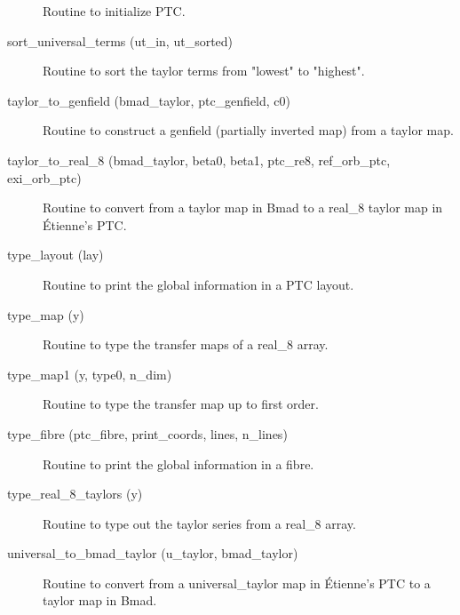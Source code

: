 \begin{description}
\label{r:set.ptc}
\item[\protect\parbox{6in}{
    set_ptc (e_tot, particle, taylor_order, integ_order, n_step, no_cavity, \\
    \hspace*{1in} force_init) }] \Newline
Routine to initialize PTC. 

\label{r:sort.universal.terms}
\item[sort_universal_terms (ut_in, ut_sorted)] \Newline
Routine to sort the taylor terms from "lowest" to "highest". 

\label{r:taylor.to.genfield}
\item[taylor_to_genfield (bmad_taylor, ptc_genfield, c0)] \Newline
Routine to construct a genfield (partially inverted map) from a taylor map. 

\label{r:taylor.to.real.8}
\item[taylor_to_real_8 (bmad_taylor, beta0, beta1, ptc_re8, ref_orb_ptc, exi_orb_ptc)] \Newline
Routine to convert from a taylor map in Bmad to a real_8 taylor map in \'Etienne's PTC. 

\label{r:type.layout}
\item[type_layout (lay)] \Newline
Routine to print the global information in a PTC layout.

\label{r:type.map}
\item[type_map (y)] \Newline
Routine to type the transfer maps of a real_8 array. 

\label{r:type.map1}
\item[type_map1 (y, type0, n_dim)] \Newline
Routine to type the transfer map up to first order. 

\label{r:type.fibre}
\item[type_fibre (ptc_fibre, print_coords, lines, n_lines)] \Newline
Routine to print the global information in a fibre.

\label{r:type.real.8.taylors}
\item[type_real_8_taylors (y)] \Newline
Routine to type out the taylor series from a real_8 array. 

\label{r:universal.to.bmad.taylor}
\item[universal_to_bmad_taylor (u_taylor, bmad_taylor)] \Newline
Routine to convert from a universal_taylor map in \'Etienne's PTC to a taylor map in Bmad. 

\end{description}

